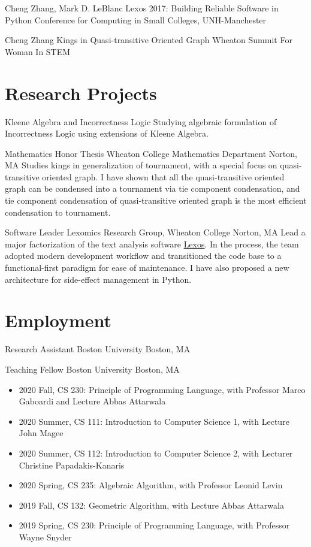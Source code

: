 \documentclass[11pt,a4paper,roman]{moderncv}        %
\begin{document}
{Cheng Zhang, Mark D. LeBlanc}
{Lexos 2017: Building Reliable Software in Python}
{Conference for Computing in Small Colleges, UNH-Manchester}
{}{}

{Cheng Zhang}
{Kings in Quasi-transitive Oriented Graph}
{Wheaton Summit For Woman In STEM}
{}{}


\section{Research Projects}

{Kleene Algebra and Incorrectness Logic}
{}{}{}
{Studying algebraic formulation of Incorrectness Logic using extensions of Kleene Algebra.}

{Mathematics Honor Thesis}
{Wheaton College Mathematics Department}
{Norton, MA}{}
{Studies kings in generalization of tournament,
with a special focus on quasi-transitive oriented graph.
I have shown that all the quasi-transitive oriented graph
can be condensed into a tournament 
via tie component condensation, and tie component condensation
of quasi-transitive oriented graph is the 
most efficient condensation to tournament.
}

{Software Leader}
{Lexomics Research Group, Wheaton College}
{Norton, MA}{}
{
  Lead a major factorization of the text analysis software 
  \href{https://github.com/WheatonCS/Lexos}{Lexos}.
  In the process, the team adopted modern development workflow and
  transitioned the code base to a functional-first paradigm for ease of maintenance.
  I have also proposed a new architecture for side-effect management in Python.
}




\section{Employment}

{Research Assistant}
{Boston University}
{Boston, MA}{}
{}

{Teaching Fellow}
{Boston University}
{Boston, MA}{}
{
  \begin{itemize}[nosep]
    \item 2020 Fall, CS 230: Principle of Programming Language,
      with Professor Marco Gaboardi and Lecture Abbas Attarwala
    \item 2020 Summer, CS 111: Introduction to Computer Science 1,
      with Lecture John Magee
    \item 2020 Summer, CS 112: Introduction to Computer Science 2,
      with Lecturer Christine Papadakis-Kanaris
    \item 2020 Spring, CS 235: Algebraic Algorithm,  
      with Professor Leonid Levin
    \item 2019 Fall, CS 132: Geometric Algorithm, 
      with Lecture Abbas Attarwala
    \item 2019 Spring, CS 230: Principle of Programming Language, 
      with Professor Wayne Snyder
  \end{itemize}
}
\end{document}
